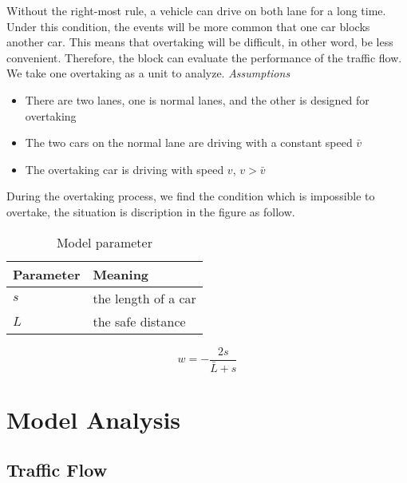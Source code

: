 Without the right-most rule, a vehicle can drive on both lane for a long time. Under this condition, the events will be more common that one car blocks another car. This means that overtaking will be difficult,
in other word, be less convenient. Therefore, the block can evaluate the performance of the traffic flow.
We take one overtaking as a unit to
analyze. 
\emph{Assumptions}
\begin{itemize}
\item There are two lanes, one is normal lanes,
and the other is designed for overtaking
\item The two cars on the normal lane are driving
with a constant speed $\bar{v}$
\item The overtaking car is driving with speed
$v$, $v > \bar{v}$
\end{itemize}

During the overtaking
process, we find the condition which
is impossible to overtake, the situation
is discription in the figure as follow.

\begin{table}
\centering
\begin{tabular}{ll}
\hline
Parameter & Meaning\\
\hline
$s$ & the length of a car \\
$L$ & the safe distance \\
\hline
\end{tabular}
\caption{Model parameter}
\end{table}

\begin{equation}
w = - \frac{2s}{\bar{L} + s} 
\end{equation}
  

\section{Model Analysis}

\subsection{Traffic Flow}
